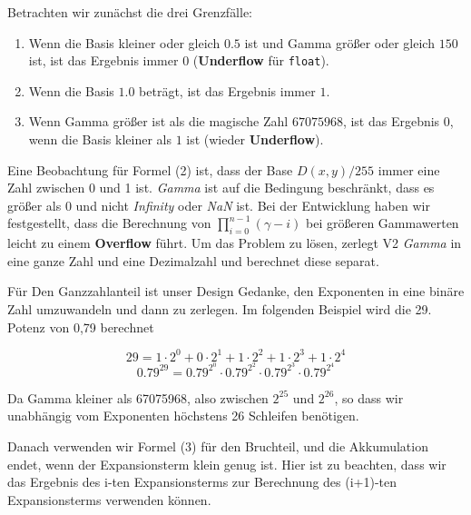 \documentclass[course=erap]{aspdoc}
\begin{document}
\par
Betrachten wir zunächst die drei Grenzfälle:
\begin{enumerate}
\item Wenn die Basis kleiner oder gleich \(0.5\) ist und Gamma größer oder gleich \(150\) ist, ist das Ergebnis immer \(0\) (\textbf{Underflow} für \texttt{float}).
\item Wenn die Basis \(1.0\) beträgt, ist das Ergebnis immer \(1\).
\item Wenn Gamma größer ist als die magische Zahl \(67075968\), ist das Ergebnis \(0\), wenn die Basis kleiner als \(1\) ist (wieder \textbf{Underflow}).
\end{enumerate}

\par
Eine Beobachtung für Formel (2) ist, dass der Base \(D(x,y)/255\) immer eine Zahl zwischen 0 und 1 ist. \emph{Gamma} ist auf die Bedingung beschränkt, dass es größer als 0 und nicht \emph{Infinity} oder \emph{NaN} ist. Bei der Entwicklung haben wir festgestellt, dass die Berechnung von \(\prod_{i=0}^{n-1} (\gamma-i)\) bei größeren Gammawerten leicht zu einem \textbf{Overflow} führt. Um das Problem zu lösen, zerlegt V2 \emph{Gamma} in eine ganze Zahl und eine Dezimalzahl und berechnet diese separat.

\par
Für Den Ganzzahlanteil ist unser Design Gedanke, den Exponenten in eine binäre Zahl umzuwandeln und dann zu zerlegen. Im folgenden Beispiel wird die 29. Potenz von 0,79 berechnet

\[
29 = 1 \cdot 2^0 + 0 \cdot 2^1 + 1 \cdot 2^2 + 1 \cdot 2^3 + 1 \cdot 2^4
\]
\[
0.79^{29} = 0.79^{2^0} \cdot 0.79^{2^2} \cdot 0.79^{2^3} \cdot 0.79^{2^4}
\]

\par
Da Gamma kleiner als 67075968, also zwischen $2^{25}$ und $2^{26}$, so dass wir unabhängig vom Exponenten höchstens 26 Schleifen benötigen.

\par
Danach verwenden wir Formel (3) für den Bruchteil, und die Akkumulation endet, wenn der Expansionsterm klein genug ist. Hier ist zu beachten, dass wir das Ergebnis des i-ten Expansionsterms zur Berechnung des (i+1)-ten Expansionsterms verwenden können.
\end{document}
